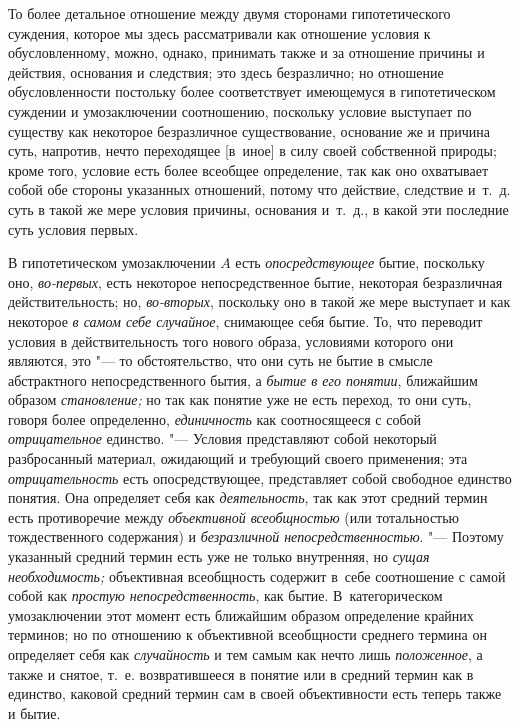 То более детальное отношение между двумя сторонами
гипотетического суждения, которое мы здесь рассматривали как отношение
условия к обусловленному, можно, однако, принимать также и за отношение
причины и действия, основания и следствия; это здесь безразлично; но
отношение обусловленности постольку более соответствует имеющемуся в
гипотетическом суждении и умозаключении соотношению, поскольку условие
выступает по существу как некоторое безразличное существование, основание
же и причина суть, напротив, нечто переходящее [в~иное] в силу своей
собственной природы; кроме того, условие есть более всеобщее определение,
так как оно охватывает собой обе стороны указанных отношений, потому что
действие, следствие и~т.~д. суть в такой же мере условия причины, основания
и~т.~д., в какой эти последние суть условия первых.

В гипотетическом умозаключении $A$ есть
{\em опосредствующее} бытие, поскольку оно, {\em во-первых}, есть
некоторое непосредственное бытие, некоторая безразличная действительность;
но, {\em во-вторых}, поскольку оно в такой же мере выступает и как некоторое
{\em в самом себе случайное},
снимающее себя бытие. То, что переводит условия в
действительность того нового образа, условиями которого они являются, это
"--- то обстоятельство, что они суть не бытие в смысле
абстрактного непосредственного бытия, а
{\em бытие в его понятии}, ближайшим образом {\em становление;} но так
как понятие уже не есть переход, то они суть, говоря более определенно,
{\em единичность} как
соотносящееся с собой {\em отрицательное} единство. "--- Условия
представляют собой некоторый разбросанный материал,
ожидающий и требующий своего применения; эта {\em отрицательность}
есть опосредствующее, представляет собой свободное единство
понятия. Она определяет себя как {\em деятельность}, так
как этот средний термин есть противоречие между
{\em объективной всеобщностью}
(или тотальностью тождественного содержания) и
{\em безразличной непосредственностью}.
"--- Поэтому указанный средний термин есть уже не только
внутренняя, но {\em сущая необходимость;} объективная всеобщность содержит
в~себе соотношение с самой собой как {\em простую непосредственность},
как бытие. В~категорическом умозаключении этот момент есть
ближайшим образом определение крайних терминов; но по отношению к
объективной всеобщности среднего термина он определяет себя как
{\em случайность} и тем самым как нечто лишь {\em положенное},
а также и снятое, т.~е. возвратившееся в понятие или в
средний термин как в единство, каковой средний термин сам в своей
объективности есть теперь также и бытие.

